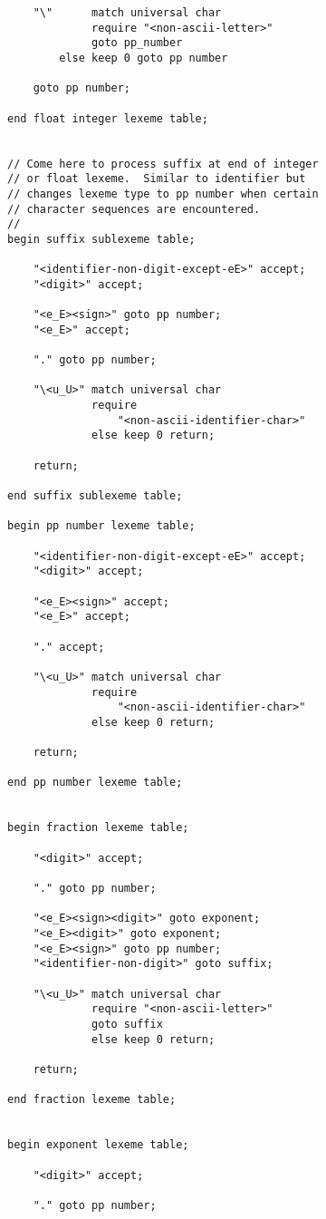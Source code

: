 \documentclass[12pt]{article}
\newenvironment{indpar}[1][0.3in]%
	{\begin{list}{}%
		     {\setlength{\itemsep}{0in}%
		      \setlength{\topsep}{0in}%
		      \setlength{\parsep}{1ex}%
		      \setlength{\labelwidth}{#1}%
		      \setlength{\leftmargin}{#1}%
		      \addtolength{\leftmargin}{\labelsep}}%
	 \item}%
	{\end{list}}
\begin{document}
\begin{indpar}
\begin{verbatim}
    "\"      match universal char
             require "<non-ascii-letter>"
             goto pp_number
        else keep 0 goto pp number

    goto pp number;

end float integer lexeme table;


// Come here to process suffix at end of integer
// or float lexeme.  Similar to identifier but
// changes lexeme type to pp number when certain
// character sequences are encountered.
//
begin suffix sublexeme table;

    "<identifier-non-digit-except-eE>" accept;
    "<digit>" accept;

    "<e_E><sign>" goto pp number;
    "<e_E>" accept;

    "." goto pp number;

    "\<u_U>" match universal char
             require
                 "<non-ascii-identifier-char>"
             else keep 0 return;

    return;

end suffix sublexeme table;

begin pp number lexeme table;

    "<identifier-non-digit-except-eE>" accept;
    "<digit>" accept;

    "<e_E><sign>" accept;
    "<e_E>" accept;

    "." accept;

    "\<u_U>" match universal char
             require
                 "<non-ascii-identifier-char>"
             else keep 0 return;

    return;

end pp number lexeme table;


begin fraction lexeme table;

    "<digit>" accept;

    "." goto pp number;

    "<e_E><sign><digit>" goto exponent;
    "<e_E><digit>" goto exponent;
    "<e_E><sign>" goto pp number;
    "<identifier-non-digit>" goto suffix;

    "\<u_U>" match universal char
             require "<non-ascii-letter>"
             goto suffix
             else keep 0 return;

    return;

end fraction lexeme table;


begin exponent lexeme table;

    "<digit>" accept;

    "." goto pp number;


\end{verbatim}
\end{indpar}
\end{document}

